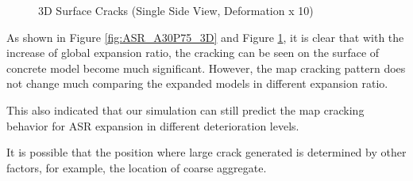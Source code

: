 \begin{figure}[!h]
  \caption{3D Surface Cracks (Single Side View, Deformation x 10)}
  \label{fig:ASR_A30P75_3DS}
\end{figure}

As shown in Figure \ref{fig:ASR_A30P75_3D} and Figure \ref{fig:ASR_A30P75_3DS}, it is clear that with the increase of global expansion ratio, the cracking can be seen on the surface of concrete model become much significant. However, the map cracking pattern does not change much comparing the expanded models in different expansion ratio.

This also indicated that our simulation can still predict the map cracking behavior for ASR expansion in different deterioration levels.

It is possible that the position where large crack generated is determined by other factors, for example, the location of coarse aggregate.

